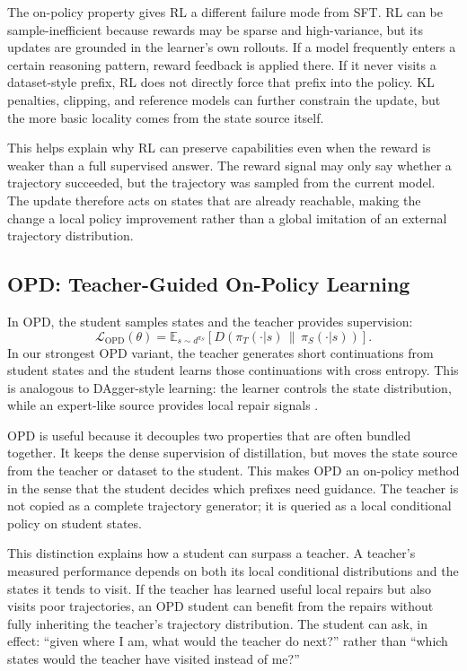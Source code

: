 \documentclass{article}
\begin{document}
The on-policy property gives RL a different failure mode from SFT. RL can be
sample-inefficient because rewards may be sparse and high-variance, but its
updates are grounded in the learner's own rollouts. If a model frequently enters
a certain reasoning pattern, reward feedback is applied there. If it never
visits a dataset-style prefix, RL does not directly force that prefix into the
policy. KL penalties, clipping, and reference models can further constrain the
update, but the more basic locality comes from the state source itself.

This helps explain why RL can preserve capabilities even when the reward is
weaker than a full supervised answer. The reward signal may only say whether a
trajectory succeeded, but the trajectory was sampled from the current model. The
update therefore acts on states that are already reachable, making the change a
local policy improvement rather than a global imitation of an external
trajectory distribution.

\subsection{OPD: Teacher-Guided On-Policy Learning}

In OPD, the student samples states and the teacher provides supervision:
\begin{equation}
    \mathcal{L}_{\mathrm{OPD}}(\theta)
    =
    \mathbb{E}_{s \sim d^{\pi_S}}
    \left[
    D(\pi_T(\cdot|s) \,\|\, \pi_S(\cdot|s))
    \right].
\end{equation}
In our strongest OPD variant, the teacher generates short continuations from
student states and the student learns those continuations with cross entropy.
This is analogous to DAgger-style learning: the learner controls the state
distribution, while an expert-like source provides local repair signals
\citep{ross2011reduction}.

OPD is useful because it decouples two properties that are often bundled
together. It keeps the dense supervision of distillation, but moves the state
source from the teacher or dataset to the student. This makes OPD an on-policy
method in the sense that the student decides which prefixes need guidance. The
teacher is not copied as a complete trajectory generator; it is queried as a
local conditional policy on student states.

This distinction explains how a student can surpass a teacher. A teacher's
measured performance depends on both its local conditional distributions and the
states it tends to visit. If the teacher has learned useful local repairs but
also visits poor trajectories, an OPD student can benefit from the repairs
without fully inheriting the teacher's trajectory distribution. The student can
ask, in effect: ``given where I am, what would the teacher do next?'' rather
than ``which states would the teacher have visited instead of me?''
\end{document}
